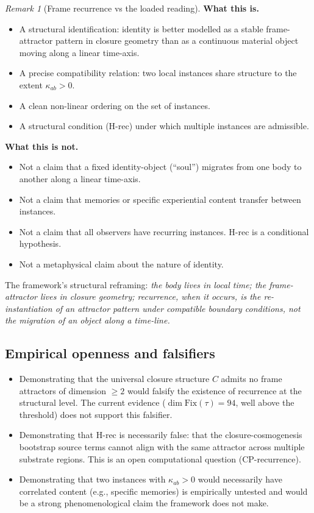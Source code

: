 \documentclass[11pt]{article}
\theoremstyle{plain}
\theoremstyle{definition}
\theoremstyle{remark}
\newtheorem{remark}[theorem]{Remark}
\newcommand{\Fix}{\mathrm{Fix}}
\begin{document}
\begin{remark}[Frame recurrence vs the loaded reading]\label{rem:reincarnation-discipline}
\textbf{What this is.}
\begin{itemize}[leftmargin=2em]
\item A structural identification: identity is better modelled as a stable frame-attractor pattern in closure geometry than as a continuous material object moving along a linear time-axis.
\item A precise compatibility relation: two local instances share structure to the extent $\kappa_{ab} > 0$.
\item A clean non-linear ordering on the set of instances.
\item A structural condition (H-rec) under which multiple instances are admissible.
\end{itemize}

\textbf{What this is not.}
\begin{itemize}[leftmargin=2em]
\item Not a claim that a fixed identity-object (``soul'') migrates from one body to another along a linear time-axis.
\item Not a claim that memories or specific experiential content transfer between instances.
\item Not a claim that all observers have recurring instances. H-rec is a conditional hypothesis.
\item Not a metaphysical claim about the nature of identity.
\end{itemize}

The framework's structural reframing: \emph{the body lives in local time; the frame-attractor lives in closure geometry; recurrence, when it occurs, is the re-instantiation of an attractor pattern under compatible boundary conditions, not the migration of an object along a time-line.}
\end{remark}

\subsection{Empirical openness and falsifiers}

\begin{itemize}[leftmargin=2em]
\item Demonstrating that the universal closure structure $C$ admits no frame attractors of dimension $\geq 2$ would falsify the existence of recurrence at the structural level. The current evidence ($\dim \Fix(\tau) = 94$, well above the threshold) does not support this falsifier.
\item Demonstrating that H-rec is necessarily false: that the closure-cosmogenesis bootstrap source terms cannot align with the same attractor across multiple substrate regions. This is an open computational question (CP-recurrence).
\item Demonstrating that two instances with $\kappa_{ab} > 0$ would necessarily have correlated content (e.g., specific memories) is empirically untested and would be a strong phenomenological claim the framework does not make.
\end{itemize}
\end{document}
